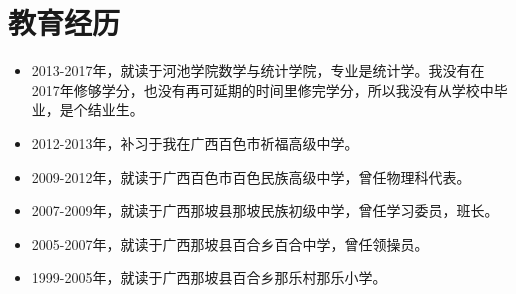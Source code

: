 \section{教育经历}
\begin{itemize}
	\item 2013-2017年，就读于河池学院数学与统计学院，专业是统计学。我没有在2017年修够学分，也没有再可延期的时间里修完学分，所以我没有从学校中毕业，是个结业生。%
	\item 2012-2013年，补习于我在广西百色市祈福高级中学。
	\item 2009-2012年，就读于广西百色市百色民族高级中学，曾任物理科代表。
	\item 2007-2009年，就读于广西那坡县那坡民族初级中学，曾任学习委员，班长。
	\item 2005-2007年，就读于广西那坡县百合乡百合中学，曾任领操员。
	\item 1999-2005年，就读于广西那坡县百合乡那乐村那乐小学。
\end{itemize}
